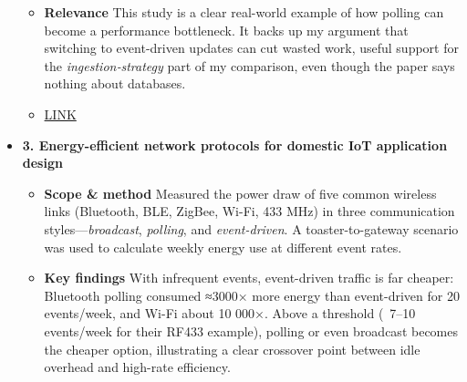 \documentclass[11pt]{article}
\begin{document}
\begin{itemize}
\begin{itemize}
      \item[] \textbf{Relevance} This study is a clear real-world example of how polling can become a performance bottleneck.  It backs up my argument that switching to event-driven updates can cut wasted work, useful support for the \textit{ingestion‐strategy} part of my comparison, even though the paper says nothing about databases.
      \item[] \href{https://link.springer.com/article/10.1186/s13677-017-0080-5}{LINK}
  \end{itemize}
  \item[] \textbf{3. Energy-efficient network protocols for domestic IoT application design}
  \begin{itemize}
      \item[] \textbf{Scope \& method} Measured the power draw of five common wireless links (Bluetooth, BLE, ZigBee, Wi-Fi, 433 MHz) in three communication styles—\emph{broadcast}, \emph{polling}, and \emph{event-driven}.  
      A toaster-to-gateway  scenario was used to calculate weekly energy use at different event rates.
      
      \item[] \textbf{Key findings} With infrequent events, event-driven traffic is far cheaper: Bluetooth polling consumed ≈3000× more energy than event-driven for 20 events/week, and Wi-Fi about 10 000×.  
      Above a threshold (~7–10 events/week for their RF433 example), polling or even broadcast becomes the cheaper option, illustrating a clear crossover point between idle overhead and high-rate efficiency.
      

\end{itemize}
\end{itemize}
\end{document}
